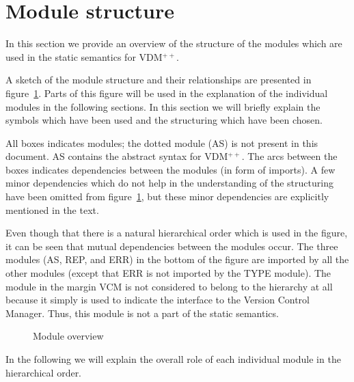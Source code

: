 \documentclass[a4paper,dvips]{article}
\def\insertfig#1#2#3#4{ %
\begin{figure}[H]
\begin{center}
\leavevmode
\epsfxsize=#2
\epsffile{#1}
\end{center}
\caption{#3} #4 
\end{figure}
}
\def\vdmsl{VDM-SL}
\def\vdmpp{VDM$^{++}$}
\def\slpp{\vdmsl}
\def\slpp{\vdmpp}
\begin{document}
\section{Module structure}

In this section we provide an overview of the structure
of the modules which are used in the static semantics for \slpp.

A sketch of the module structure and their relationships are presented
in figure~\ref{overview}. Parts of this figure will be used in the
explanation of the individual modules in the following sections. In
this section we will briefly explain the symbols which have been used and the
structuring which have been chosen.

All boxes indicates modules; the dotted module (AS)
is not present in this document. AS contains the abstract syntax for
\slpp.
The arcs between the boxes
indicates dependencies between the modules (in form of imports). A few
minor dependencies which do not help in the understanding of the
structuring have been omitted from figure~\ref{overview}, but these
minor dependencies are explicitly mentioned in the text.

Even though that there is a natural hierarchical order which is used
in the figure, it can be seen that mutual dependencies between the
modules occur. The three modules (AS, REP, and ERR) in the
bottom of the figure are imported by all the other modules (except
that ERR is not imported by the TYPE module).
The module in the margin VCM
is not considered to belong to the hierarchy at all because it
simply is used to indicate the interface to
the Version Control Manager. Thus, this module is not a part of the
static semantics.

\insertfig{overview.ps}{13cm}{Module overview}{\label{overview}} 

In the following we will explain the overall role of each individual
module in the hierarchical order.
\end{document}
